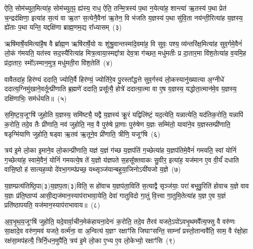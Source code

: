 ऐति॒ सोम॑च्युत॒मित्या॑ह॒ सोम॑च्युत॒ꣴ॒ ह्य॑स्य॒ राध॒ ऐति॒ तन्मि॒त्रस्य॑ प॒था न॒येत्या॑ह॒ शान्त्या॑ ऋ॒तस्य॑ प॒था प्रेत॑ च॒न्द्रद॑क्षिणा॒ इत्या॑ह स॒त्यं वा ऋ॒तꣳ स॒त्येनै॒वैना॑ ऋ॒तेन॒ वि भ॑जति य॒ज्ञस्य॑ प॒था सु॑वि॒ता नय॑न्ती॒रित्या॑ह य॒ज्ञस्य॒ ह्ये॑ताः प॒था यन्ति॒ यद्दक्षि॑णा ब्राह्म॒णम॒द्य रा᳚ध्यासम्~(३)

ऋषि॑मार्\mbox{}षे॒यमित्या॑है॒ष वै ब्रा᳚ह्म॒ण ऋषि॑रार्\mbox{}षे॒यो यः शु॑श्रु॒वान्तस्मा॑दे॒वमा॑ह॒ वि सुवः॒ पश्य॒ व्य॑न्तरि॑क्ष॒मित्या॑ह सुव॒र्गमे॒वैनं॑ लो॒कं ग॑मयति॒ यत॑स्व सद॒स्यै॑रित्या॑ह मित्र॒त्वाया॒स्मद्दा᳚त्रा देव॒त्रा ग॑च्छत॒ मधु॑मतीः प्र दा॒तार॒मा वि॑श॒तेत्या॑ह व॒यमि॒ह प्र॑दा॒तारः॒ स्मो᳚\-ऽस्मान॒मुत्र॒ मधु॑मती॒रा वि॑श॒तेति॑~(४)

वावैतदा॑ह॒ हिर॑ण्यं ददाति॒ ज्योति॒र्वै हिर॑ण्यं॒ ज्योति॑रे॒व पु॒रस्ता᳚द्धत्ते सुव॒र्गस्य॑ लो॒कस्यानु॑ख्यात्या अ॒ग्नीधे॑ ददात्य॒ग्निमु॑खाने॒वर्तून्प्री॑णाति ब्र॒ह्मणे॑ ददाति॒ प्रसू᳚त्यै॒ होत्रे॑ ददात्या॒त्मा वा ए॒ष य॒ज्ञस्य॒ यद्धोता॒त्मान॑मे॒व य॒ज्ञस्य॒ दक्षि॑णाभिः॒ सम॑र्धयति॥~(५)

{\anuvakamend[{हिर॑ण्य॒ꣳ॒ राधो॑ राध्यासम॒मुत्र॒ मधु॑मती॒रा वि॑श॒तेत्य॒ष्टात्रिꣳ॑शच्च}]}%

स॒मि॒ष्ट॒य॒जूꣳषि॑ जुहोति य॒ज्ञस्य॒ समि॑ष्ट्यै॒ यद्वै य॒ज्ञस्य॑ क्रू॒रं यद्विलि॑ष्टं॒ यद॒त्येति॒ यन्नात्येति॒ यद॑तिक॒रोति॒ यन्नापि॑ क॒रोति॒ तदे॒व तैः प्री॑णाति॒ नव॑ जुहोति॒ नव॒ वै पुरु॑षे प्रा॒णाः पुरु॑षेण य॒ज्ञः सम्मि॑तो॒ यावा॑ने॒व य॒ज्ञस्तम्प्री॑णाति॒ षडृग्मि॑याणि जुहोति॒ षड्वा ऋ॒तव॑ ऋ॒तूने॒व प्री॑णाति॒ त्रीणि॒ यजूꣳ॑षि~(६)

त्रय॑ इ॒मे लो॒का इ॒माने॒व लो॒कान्प्री॑णाति॒ यज्ञ॑ य॒ज्ञं ग॑च्छ य॒ज्ञप॑तिं ग॒च्छेत्या॑ह य॒ज्ञप॑तिमे॒वैनं॑ गमयति॒ स्वां योनिं॑ ग॒च्छेत्या॑ह॒ स्वामे॒वैनं॒ योनिं॑ गमयत्ये॒ष ते॑ य॒ज्ञो य॑ज्ञपते स॒हसू᳚क्तवाकः सु॒वीर॒ इत्या॑ह॒ यज॑मान ए॒व वी॒र्यं॑ दधाति वासि॒ष्ठो ह॑ सात्यह॒व्यो दे॑वभा॒गम्प॑प्रच्छ॒ यथ्सृञ्ज॑यान्बहुया॒जिनो\-ऽयी॑यजो य॒ज्ञे~(७)

य॒ज्ञम्प्रत्य॑तिष्ठि॒पा(३)य॒ज्ञप॒ता(३)विति॒ स हो॑वाच य॒ज्ञप॑ता॒विति॑ स॒त्याद्वै सृञ्ज॑याः॒ परा॑ बभूवु॒रिति॑ होवाच य॒ज्ञे वाव य॒ज्ञः प्र॑ति॒ष्ठाप्य॑ आसी॒द्यज॑मान॒स्याप॑राभावा॒येति॒ देवा॑ गातुविदो गा॒तुं वि॒त्त्वा गा॒तुमि॒तेत्या॑ह य॒ज्ञ ए॒व य॒ज्ञं प्रति॑\-ष्ठापयति॒ यज॑मान॒स्याप॑राभावाय॥~(८)

{\anuvakamend[{यजूꣳ॑षि य॒ज्ञ एक॑चत्वारिꣳशच्च}]}%

अ॒व॒भृ॒थ॒य॒जूꣳषि॑ जुहोति॒ यदे॒वार्वा॒चीन॒मेक॑हायना॒देनः॑ क॒रोति॒ तदे॒व तैरव॑ यजते॒\-ऽपो॑\-ऽवभृ॒थमवै᳚त्य॒फ्सु वै वरु॑णः सा॒क्षादे॒व वरु॑ण॒मव॑ यजते॒ वर्त्म॑ना॒ वा अ॒न्वित्य॑ य॒ज्ञꣳ रक्षाꣳ॑सि जिघाꣳसन्ति॒ साम्ना᳚ प्रस्तो॒तान्ववै॑ति॒ साम॒ वै र॑क्षो॒हा रक्ष॑सा॒मप॑हत्यै॒ त्रिर्नि॒धन॒मुपै॑ति॒ त्रय॑ इ॒मे लो॒का ए॒भ्य ए॒व लो॒केभ्यो॒ रक्षाꣳ॑सि~(९)

